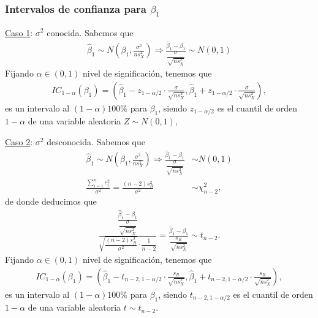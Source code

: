 \subsubsection{Intervalos de confianza para $\beta_1$}

\underline{Caso 1}: $\sigma^2$ conocida. Sabemos que
\begin{align*}
    \widehat{\beta}_1 \sim N \left( \beta_1, \frac{\sigma^2}{ns_X^2} \right) \Longrightarrow \frac{\widehat{\beta}_1 - \beta_1}{\dfrac{\sigma}{\sqrt{ns_X^2}}} \sim N(0,1)
\end{align*}
Fijando $\alpha \in (0,1)$ nivel de significación, tenemos que
\begin{align*}
    IC_{1-\alpha}(\beta_1) = \left( \widehat{\beta}_1 - z_{1 - \alpha/2} \cdot \frac{\sigma}{\sqrt{ns_X^2}}, \widehat{\beta}_1 + z_{1 - \alpha/2} \cdot \frac{\sigma}{\sqrt{ns_X^2}} \right),
\end{align*}
es un intervalo al $(1- \alpha) 100 \%$ para $\beta_1$, siendo $z_{1 - \alpha/2}$ es el cuantil de orden $1 - \alpha$ de una variable aleatoria $Z \sim N(0,1)$,

\underline{Caso 2}: $\sigma^2$ desconocida. Sabemos que
\begin{align*}
    \widehat{\beta}_1 \sim N \left( \beta_1, \frac{\sigma^2}{ns_X^2} \right) \Longrightarrow \frac{\widehat{\beta}_1 - \beta_1}{\dfrac{\sigma}{\sqrt{ns_X^2}}} & \sim N(0,1)        \\
    \frac{\sum_{i=1}^{n} e_i^2}{\sigma^2} = \frac{(n-2)s_R^2}{\sigma^2}                                                                                        & \sim \chi_{n-2}^2,
\end{align*}
de donde deducimos que
\begin{align*}
    \frac{\dfrac{\widehat{\beta}_1 - \beta_1}{\dfrac{\sigma}{\sqrt{ns_X^2}}}}{\sqrt{\dfrac{(n-2)s_R^2}{\sigma^2}} \cdot \dfrac{1}{n-2}} = \frac{\widehat{\beta}_1 - \beta_1}{\dfrac{s_R}{\sqrt{ns_X^2}}} \sim t_{n-2}.
\end{align*}
Fijando $\alpha \in (0,1)$ nivel de significación, tenemos que
\begin{align*}
    IC_{1-\alpha}(\beta_1) = \left( \widehat{\beta}_1 - t_{n-2,1 - \alpha/2} \cdot \frac{s_R}{\sqrt{ns_X^2}}, \widehat{\beta}_1 + t_{n-2,1 - \alpha/2} \cdot \frac{s_R}{\sqrt{ns_X^2}} \right),
\end{align*}
es un intervalo al $(1- \alpha) 100 \%$ para $\beta_1$, siendo $t_{n-2,1 - \alpha/2}$ es el cuantil de orden $1 - \alpha$ de una variable aleatoria $t \sim t_{n-2}$.

